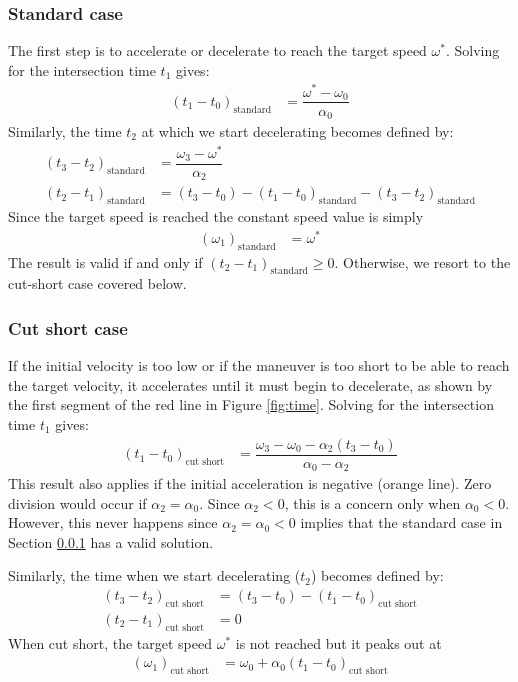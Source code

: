 \documentclass[12pt, a4paper]
{article}
\providecommand{\lr}[1]{\left(#1\right)}
\providecommand{\sub}[1]{_{\text{#1}}}
\providecommand{\w}{\omega}
\providecommand{\wt}{\w^*}
\renewcommand{\a}{\alpha}
\begin{document}
\subsubsection{Standard case}
\label{sec:t:standard}
The first step is to accelerate or decelerate to reach the target speed $\wt$.
Solving for the intersection time $t_1$ gives:
%
\begin{align}
    \label{eq:t:t1mt0:standard}
    \lr{t_1 - t_0}\sub{standard} &= \dfrac{\wt-\w_0}{\a_0}
\end{align}
%
Similarly, the time $t_2$ at which we start decelerating becomes defined by:
%
\begin{align}
    \label{eq:t:t3mt2:standard}
    \lr{t_3 - t_2}\sub{standard} &= \dfrac{\w_3-\wt}{\a_2}\\[1em]
    \label{eq:t:t2mt1:standard}
    \lr{t_2 - t_1}\sub{standard} &=
        (t_3-t_0) - \lr{t_1 - t_0}\sub{standard} - \lr{t_3 - t_2}\sub{standard}
\end{align}
%
Since the target speed is reached the constant speed value is simply
\begin{align}
    \lr{\w_1}\sub{standard} &= \wt
\end{align}
%
The result is valid if and only if $\lr{t_2 - t_1}\sub{standard}\geq 0$.
Otherwise, we resort to the cut-short case covered below.

\subsubsection{Cut short case}
\label{sec:t:cutshort}
If the initial velocity is too low or if the maneuver is too short to be able
to reach the target velocity, it accelerates until it must begin to
decelerate, as shown by the first segment of the red line in Figure
\ref{fig:time}. Solving for the intersection time $t_1$
gives:
%
\begin{align}
    \label{eq:t:t1mt0:cutshort}
    \lr{t_1 - t_0}\sub{cut short} &=
        \dfrac{\w_3-\w_0 - \a_2(t_3-t_0)}{\a_0-\a_2}
\end{align}
%
This result also applies if the initial acceleration is negative (orange line).
Zero division would occur if $\a_2 = \a_0$. Since $\a_2 < 0$, this is a concern
only when $\a_0 < 0$. However, this never happens since $\a_2 = \a_0 < 0$
implies that the standard case in Section \ref{sec:t:standard} has a valid
solution.

Similarly, the time when we start decelerating ($t_2$) becomes defined by:
%
\begin{align}
    \label{eq:t:t3mt2:cutshort}
    \lr{t_3 - t_2}\sub{cut short} &= (t_3 - t_0) - (t_1 - t_0)\sub{cut short}
    \\[1em]
    \label{eq:t:t2mt1:cutshort}
    \lr{t_2 - t_1}\sub{cut short} &= 0
\end{align}
%
When cut short, the target speed $\wt$ is not reached but it peaks out at
%
\begin{align}
    \lr{\w_1}\sub{cut short} &= \w_0 + \a_0(t_1 - t_0)\sub{cut short}
\end{align}
\end{document}
